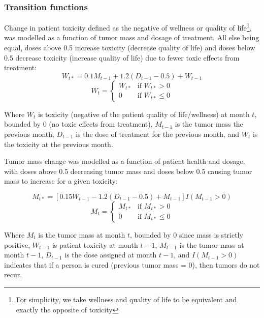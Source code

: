 \documentclass[12pt]{article}
\begin{document}
\subsubsection{Transition functions} %
\label{ssub:transition_functions}

Change in patient toxicity defined as the negative of wellness or quality of life\footnote{For simplicity, we take wellness and quality of life to be equivalent and exactly the opposite of toxicity}, was modelled as a function of tumor mass and dosage of treatment. All else being equal, doses above 0.5 increase toxicity (decrease quality of life) and doses below 0.5 decrease toxicity (increase quality of life) due to fewer toxic effects from treatment:
%
\begin{equation}
W_{t*} = 0.1 M_{t-1} + 1.2 (D_{t-1} - 0.5) + W_{t - 1}
\end{equation}
\begin{equation}
W_{t} = \begin{cases}
  W_{t*} &\text{if } W_{t*} > 0 \\
  0 &\text{if } W_{t*} \leq 0
\end{cases}
\end{equation}

Where $W_{t}$ is toxicity (negative of the patient quality of life/wellness) at month $t$, bounded by 0 (no toxic effects from treatment),
$M_{t-1}$ is the tumor mass the previous month,
$D_{t-1}$ is the dose of treatment for the previous month, and
$W_{t}$ is the toxicity at the previous month.

Tumor mass change was modelled as a function of patient health and dosage, with doses above 0.5 decreasing tumor mass and doses below 0.5 causing tumor mass to increase for a given toxicity:

\begin{equation}
M_{t*} = [0.15 W_{t-1} - 1.2 (D_{t-1} - 0.5) + M_{t - 1}] I(M_{t-1} > 0)
\end{equation}
\begin{equation}
M_{t} = \begin{cases}
  M_{t*} &\text{if } M_{t*} > 0 \\
  0 &\text{if } M_{t*} \leq 0
\end{cases}
\end{equation}

Where $M_{t}$ is the tumor mass at month $t$, bounded by 0 since mass is strictly positive,
$W_{t-1}$ is patient toxicity at month $t - 1$,
$M_{t-1}$ is the tumor mass at month $t - 1$,
$D_{t-1}$ is the dose assigned at month $t - 1$, and
$I(M_{t-1} > 0)$ indicates that if a person is cured (previous tumor mass = 0), then tumors do not recur.
\end{document}
